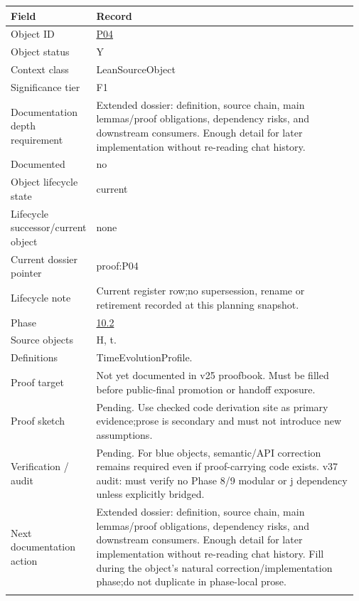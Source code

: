 \begin{longtable}{L{0.16\linewidth} L{0.81\linewidth}}
\hline
\textbf{Field} & \textbf{Record}\\
\hline
Object ID & \hyperlink{object-row-P04}{P04}\\
\hline\addlinespace[0.20em]
Object status & Y\\
\hline\addlinespace[0.20em]
Context class & LeanSourceObject\\
\hline\addlinespace[0.20em]
Significance tier & F1\\
\hline\addlinespace[0.20em]
Documentation depth requirement & Extended dossier: definition, source chain, main lemmas/\allowbreak{}proof obligations, dependency risks, and downstream consumers. Enough detail for later implementation without re-reading chat history.\\
\hline\addlinespace[0.20em]
Documented & no\\
\hline\addlinespace[0.20em]
Object lifecycle state & current\\
\hline\addlinespace[0.20em]
Lifecycle successor/\allowbreak{}current object & none\\
\hline\addlinespace[0.20em]
Current dossier pointer & proof:P04\\
\hline\addlinespace[0.20em]
Lifecycle note & Current register row;\newline no supersession, rename or retirement recorded at this planning snapshot.\\
\hline\addlinespace[0.20em]
Phase & \hyperlink{phase-row-10-2}{10.2}\\
\hline\addlinespace[0.20em]
Source objects & H, t.\\
\hline\addlinespace[0.20em]
Definitions & TimeEvolutionProfile.\\
\hline\addlinespace[0.20em]
Proof target & Not yet documented in v25 proofbook. Must be filled before public-final promotion or handoff exposure.\\
\hline\addlinespace[0.20em]
Proof sketch & Pending. Use checked code derivation site as primary evidence;\newline prose is secondary and must not introduce new assumptions.\\
\hline\addlinespace[0.20em]
Verification /\allowbreak{} audit & Pending. For blue objects, semantic/\allowbreak{}API correction remains required even if proof-carrying code exists. v37 audit: must verify no Phase 8/\allowbreak{}9 modular or j dependency unless explicitly bridged.\\
\hline\addlinespace[0.20em]
Next documentation action & Extended dossier: definition, source chain, main lemmas/\allowbreak{}proof obligations, dependency risks, and downstream consumers. Enough detail for later implementation without re-reading chat history. Fill during the object's natural correction/\allowbreak{}implementation phase;\newline do not duplicate in phase-local prose.\\
\hline\addlinespace[0.20em]
\end{longtable}
